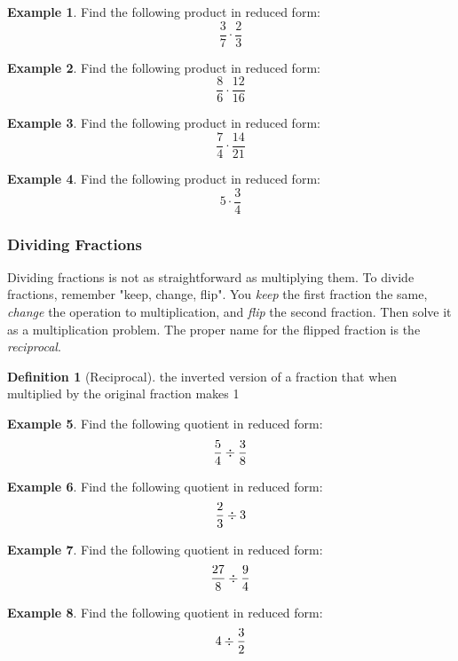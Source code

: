\documentclass[addpoints,12pt]{exam}
\theoremstyle{definition}
\newtheorem{example}{Example}[subsection]
\newtheorem{definition}{Definition}[subsection]
\begin{document}
\begin{example}
Find the following product in reduced form: \[\dfrac{3}{7}\cdot\dfrac{2}{3}\]
\vspace{.75in}
\end{example}
\begin{example}
Find the following product in reduced form: \[\dfrac{8}{6}\cdot\dfrac{12}{16}\]
\vspace{.75in}
\end{example}
\begin{example}
Find the following product in reduced form: \[\dfrac{7}{4}\cdot\dfrac{14}{21}\]
\vspace{.75in}
\end{example}
\begin{example}
Find the following product in reduced form: \[5 \cdot\dfrac{3}{4}\]
\vspace{.75in}
\end{example}

\subsubsection*{Dividing Fractions}
Dividing fractions is not as straightforward as multiplying them. To divide fractions, remember "keep, change, flip". You \emph{keep} the first fraction the same, \emph{change} the operation to multiplication, and \emph{flip} the second fraction. Then solve it as a multiplication problem.
\vspace{.1in}
The proper name for the flipped fraction is the \emph{reciprocal}.
\vspace{.1in}
\begin{definition}[Reciprocal]
the inverted version of a fraction that when multiplied by the original fraction makes 1
\end{definition}
\vspace{.25in}

\begin{example}
Find the following quotient in reduced form: \[\dfrac{5}{4}\divisionsymbol\dfrac{3}{8}\]
\vspace{.75in}
\end{example}
\begin{example}
Find the following quotient in reduced form: \[\dfrac{2}{3}\divisionsymbol 3\]
\vspace{.75in}
\end{example}
\begin{example}
Find the following quotient in reduced form: \[\dfrac{27}{8}\divisionsymbol\dfrac{9}{4}\]
\vspace{.75in}
\end{example}
\begin{example}
Find the following quotient in reduced form: \[4 \divisionsymbol\dfrac{3}{2}\]
\vspace{.75in}
\end{example}
\end{document}
